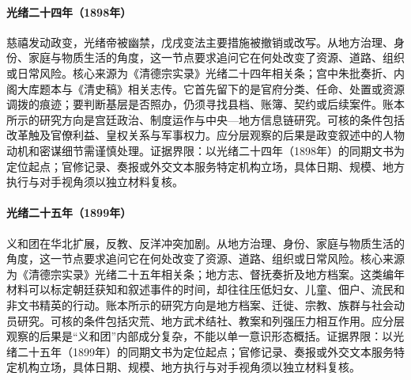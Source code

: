 \hypertarget{social:EQ-1898-WUXU-COUP}{}\paragraph{光绪二十四年（1898年）}慈禧发动政变，光绪帝被幽禁，戊戌变法主要措施被撤销或改写。从地方治理、身份、家庭与物质生活的角度，这一节点要求追问它在何处改变了资源、道路、组织或日常风险。核心来源为《清德宗实录》光绪二十四年相关条；宫中朱批奏折、内阁大库题本与《清史稿》相关志传。它首先留下的是官府分类、任命、处置或资源调拨的痕迹；要判断基层是否照办，仍须寻找县档、账簿、契约或后续案件。账本所示的研究方向是宫廷政治、制度运作与中央—地方信息链研究。可核的条件包括改革触及官僚利益、皇权关系与军事权力。应分层观察的后果是政变叙述中的人物动机和密谋细节需谨慎处理。证据界限：以光绪二十四年（1898年）的同期文书为定位起点；官修记录、奏报或外交文本服务特定机构立场，具体日期、规模、地方执行与对手视角须以独立材料复核。
\hypertarget{social:EQ-1899-BOXER-UPRISING}{}\paragraph{光绪二十五年（1899年）}义和团在华北扩展，反教、反洋冲突加剧。从地方治理、身份、家庭与物质生活的角度，这一节点要求追问它在何处改变了资源、道路、组织或日常风险。核心来源为《清德宗实录》光绪二十五年相关条；地方志、督抚奏折及地方档案。这类编年材料可以标定朝廷获知和叙述事件的时间，却往往压低妇女、儿童、佃户、流民和非文书精英的行动。账本所示的研究方向是地方档案、迁徙、宗教、族群与社会动员研究。可核的条件包括灾荒、地方武术结社、教案和列强压力相互作用。应分层观察的后果是“义和团”内部成分复杂，不能以单一意识形态概括。证据界限：以光绪二十五年（1899年）的同期文书为定位起点；官修记录、奏报或外交文本服务特定机构立场，具体日期、规模、地方执行与对手视角须以独立材料复核。
